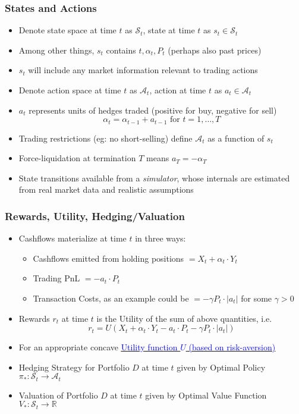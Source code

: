 \documentclass{beamer}
\begin{document}
\begin{frame}
\frametitle{States and Actions}
\begin{itemize}
\item Denote state space at time $t$ as $\mathcal{S}_t$, state at time $t$ as $s_t \in \mathcal{S}_t$
\item Among other things, $s_t$ contains $t, \alpha_t, P_t$ (perhaps also past prices)
\item $s_t$ will include any market information relevant to trading actions
\item Denote action space at time $t$ as $\mathcal{A}_t$, action at time $t$ as $a_t \in \mathcal{A}_t$
\item $a_t$ represents units of hedges traded (positive for buy, negative for sell)
$$\alpha_t = \alpha_{t-1} + a_{t-1} \mbox{ for } t = 1, \ldots, T$$
\item Trading restrictions (eg: no short-selling) define $\mathcal{A}_t$ as a function of $s_t$
\item Force-liquidation at termination $T$ means $a_T = -\alpha_T$
\item State transitions available from a {\em simulator}, whose internals are estimated from real market data and realistic assumptions
\end{itemize}
\end{frame}

\begin{frame}
\frametitle{Rewards, Utility, Hedging/Valuation}
\begin{itemize}
\item Cashflows materialize at time $t$ in three ways:
\begin{itemize}
\item Cashflows emitted from holding positions $= X_t + \alpha_t \cdot Y_t$
\item Trading PnL $= -a_t \cdot P_t$
\item Transaction Costs, as an example could be $= - \gamma P_t \cdot |a_t|$ for some $\gamma > 0$
\end{itemize}
\item Rewards $r_t$ at time $t$ is the Utility of the sum of above quantities, i.e.
$$r_t = U(X_t + \alpha_t \cdot Y_t - a_t \cdot P_t - \gamma P_t \cdot |a_t|)$$
\item For an appropriate concave \href{https://github.com/coverdrive/technical-documents/blob/master/finance/cme241/UtilityTheoryForRisk.pdf}{\underline{\textcolor{blue}{Utility function $U$ (based on risk-aversion)}}}
\item Hedging Strategy for Portfolio $D$ at time $t$ given by Optimal Policy $\pi_* : \mathcal{S}_t \rightarrow \mathcal{A}_t$
\item Valuation of Portfolio $D$ at time $t$ given by Optimal Value Function $V_* : \mathcal{S}_t \rightarrow \mathbb{R}$
\end{itemize}
\end{frame}
\end{document}
